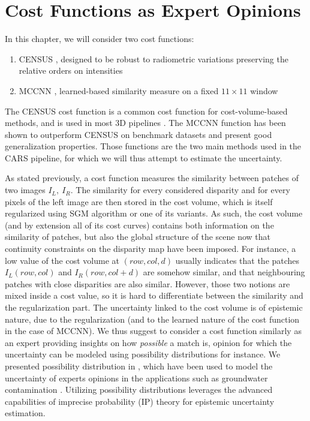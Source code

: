 \section{Cost Functions as Expert Opinions}
In this chapter, we will consider two cost functions:
\begin{enumerate}
    \item CENSUS \cite{zabih_non-parametric_1994}, designed to be robust to radiometric variations preserving the relative orders on intensities
    \item MCCNN \cite{zbontar_stereo_2016}, learned-based similarity measure on a fixed $11\times 11$ window
\end{enumerate}
The CENSUS cost function is a common cost function for cost-volume-based methods, and is used in most 3D pipelines \cite{franchis_automatic_2014,shean_automated_2016,rupnik_micmac_2017,youssefi_cars_2020}. The MCCNN function has been shown to outperform CENSUS on benchmark datasets \cite{zbontar_stereo_2016} and present good generalization properties. Those functions are the two main methods used in the CARS pipeline, for which we will thus attempt to estimate the uncertainty. 

As stated previously, a cost function measures the similarity between patches of two images \(I_L,~I_R\). The similarity for every considered disparity and for every pixels of the left image are then stored in the cost volume, which is itself regularized using SGM algorithm or one of its variants. As such, the cost volume (and by extension all of its cost curves) contains both information on the similarity of patches, but also the global structure of the scene now that continuity constraints on the disparity map have been imposed. For instance, a low value of the cost volume at \( (row, col, d) \) usually indicates that the patches \(I_L(row,col)\)  and \(I_R(row,col+d)\) are somehow similar, and that neighbouring patches with close disparities are also similar. However, those two notions are mixed inside a cost value, so it is hard to differentiate between the similarity and the regularization part. The uncertainty linked to the cost volume is of epistemic nature, due to the regularization (and to the learned nature of the cost function in the case of MCCNN). We thus suggest to consider a cost function similarly as an expert providing insights on how \textit{possible} a match is, opinion for which the uncertainty can be modeled using possibility distributions for instance. We presented possibility distribution in , which have been used to model the uncertainty of experts opinions in the applications such as groundwater contamination \cite{bardossy_l-_1995, baudrit_joint_2007}. Utilizing possibility distributions leverages the advanced capabilities of imprecise probability (IP) theory for epistemic uncertainty estimation.

